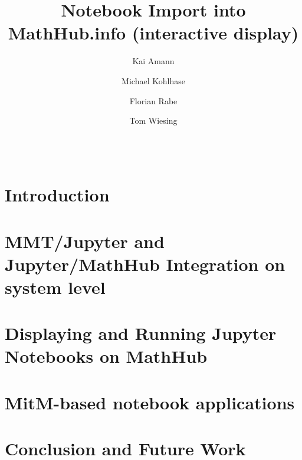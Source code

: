 \documentclass[book]{deliverablereport}
\title{Notebook Import into MathHub.info (interactive display)}
\author{Kai Amann}
\author{Michael Kohlhase}
\author{Florian Rabe}
\author{Tom Wiesing}
\begin{document}
\begin{abstract}\strut\\\end{abstract}
\maketitle
\setcounter{tocdepth}{2}
\newpage\tableofcontents\newpage

\section{Introduction}\label{sec:intro}


\section{MMT/Jupyter and Jupyter/MathHub Integration on system level}\label{sec:mmt-jp}


\section{Displaying and Running Jupyter Notebooks on MathHub}\label{sec:nb-mh}


\section{MitM-based notebook applications}\label{sec:mitm-nb}


\section{Conclusion and Future Work}\label{sec:concl}


\printbibliography
\end{document}
